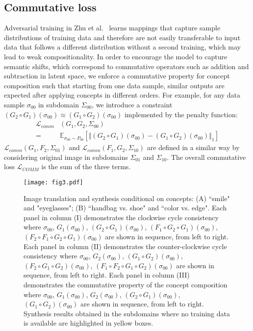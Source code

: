 \documentclass[10pt,twocolumn,letterpaper]{article}
\begin{document}
\subsection{Commutative loss}
Adversarial training in Zhu et al.~\cite{CycleGAN} learns mappings that capture sample distributions of training data and therefore are not easily transferable to input data that follows a different distribution without a second training, which may lead to weak compositionality. In order to encourage the model to capture semantic shifts, which correspond to commutative operators such as addition and subtraction in latent space, we enforce a commutative property for concept composition such that starting from one data sample, similar outputs are expected after applying concepts in different orders. For example, for any data sample $\sigma_{00}$ in subdomain $\Sigma_{00}$, we introduce a constraint $(G_2\circ G_1)(\sigma_{00})\approx (G_1\circ G_2)(\sigma_{00})$ implemented by the penalty function:
\begin{align}
\mathcal{L}_{comm}&(G_1,G_2,\Sigma_{00}) \nonumber \\
=&\mathbb{E}_{\sigma_{00}\sim P_{00}}[\Vert (G_2\circ G_1)(\sigma_{00})-(G_1\circ G_2)(\sigma_{00})\Vert_1]
\end{align} $\mathcal{L}_{comm}(G_1,F_2,\Sigma_{01})$ and $\mathcal{L}_{comm}(F_1,G_2,\Sigma_{10})$ are defined in a similar way by considering original image in subdomains $\Sigma_{01}$ and $\Sigma_{10}$. The overall commutative loss $\mathcal{L}_{COMM}$ is the sum of the three terms.



\begin{figure*}[!htb]
\begin{center}
\texttt{[image: fig3.pdf]}
\end{center}
   \caption{Image translation and synthesis conditional on concepts:  (A) ``smile" and "eyeglasses"; (B) ``handbag vs. shoe" and ``color vs. edge". Each panel in column (I) demonstrates the clockwise cycle consistency where $\sigma_{00}$, $G_1(\sigma_{00})$, $(G_2\circ G_1)(\sigma_{00})$, $(F_1\circ G_2\circ G_1)(\sigma_{00})$, $(F_2\circ F_1\circ G_2\circ G_1)(\sigma_{00})$ are shown in sequence, from left to right. Each panel in column (II) demonstrates the counter-clockwise cycle consistency  where $\sigma_{00}$, $G_2(\sigma_{00})$, $(G_1\circ G_2)(\sigma_{00})$, $(F_2\circ G_1\circ G_2)(\sigma_{00})$, $(F_1\circ F_2\circ G_1\circ G_2)(\sigma_{00})$ are shown in sequence, from left to right. Each panel in column (III) demonstrates the commutative property of the concept composition where $\sigma_{00}$, $G_1(\sigma_{00})$, $G_2(\sigma_{00})$, $(G_2\circ G_1)(\sigma_{00})$, $(G_1\circ G_2)(\sigma_{00})$ are shown in sequence, from left to right. Synthesis results obtained in the subdomains where no training data is available are highlighted in yellow boxes.}
\vspace{-1.5em}
\label{fig:3panels}
\end{figure*}
\end{document}
